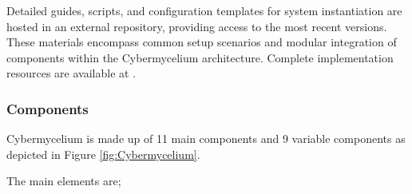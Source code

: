 \documentclass[review]{elsarticle}
\begin{document}
Detailed guides, scripts, and configuration templates for system instantiation are hosted in an external repository, providing access to the most recent versions. These materials encompass common setup scenarios and modular integration of components within the Cybermycelium architecture. Complete implementation resources are available at \cite{cybermycelium2023}.


\subsubsection{Components}
Cybermycelium is made up of 11 main components and 9 variable components as depicted in Figure \ref{fig:Cybermycelium}.








The main elements are;
\end{document}
